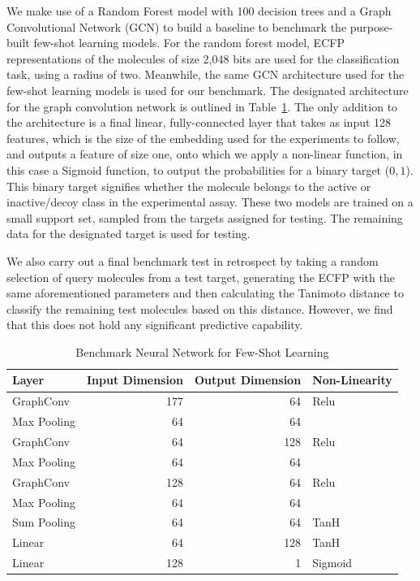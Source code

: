 We make use of a Random Forest model with 100 decision trees and a Graph Convolutional Network (GCN) to build a baseline to benchmark the purpose-built few-shot learning models. For the random forest model, ECFP representations of the molecules of size 2,048 bits are used for the classification task, using a radius of two. Meanwhile, the same GCN architecture used for the few-shot learning models is used for our benchmark. The designated architecture for the graph convolution network is outlined in Table~\ref{table:benchmarkArchi}. The only addition to the architecture is a final linear, fully-connected layer that takes as input 128 features, which is the size of the embedding used for the experiments to follow, and outputs a feature of size one, onto which we apply a non-linear function, in this case a Sigmoid function, to output the probabilities for a binary target (${0, 1}$). This binary target signifies whether the molecule belongs to the active or inactive/decoy class in the experimental assay. These two models are trained on a small support set, sampled from the targets assigned for testing. The remaining data for the designated target is used for testing.

We also carry out a final benchmark test in retrospect by taking a random selection of query molecules from a test target, generating the ECFP with the same aforementioned parameters and then calculating the Tanimoto distance to classify the remaining test molecules based on this distance. However, we find that this does not hold any significant predictive capability. 

\begin{table}
	\centering
	\begin{tabular}{@{}lrrl@{}}
	\hline
	\textbf{Layer} & \textbf{Input Dimension} & \textbf{Output Dimension} & \textbf{Non-Linearity} \\
	\hline
	GraphConv 	& 177 	& 64 	& Relu \\
	Max Pooling & 64 	& 64 	&  \\
	GraphConv 	& 64 	& 128 	& Relu \\
	Max Pooling & 64 	& 64 	&  \\
	GraphConv 	& 128 	& 64 	& Relu \\
	Max Pooling & 64 	& 64 	&  \\
	Sum Pooling & 64 	& 64 	& TanH \\
	Linear 		& 64 	& 128 	& TanH \\
	Linear 		& 128 	& 1 	& Sigmoid \\
	\hline
	\end{tabular}
	\caption{Benchmark Neural Network for Few-Shot Learning}
	\label{table:benchmarkArchi}
\end{table}

